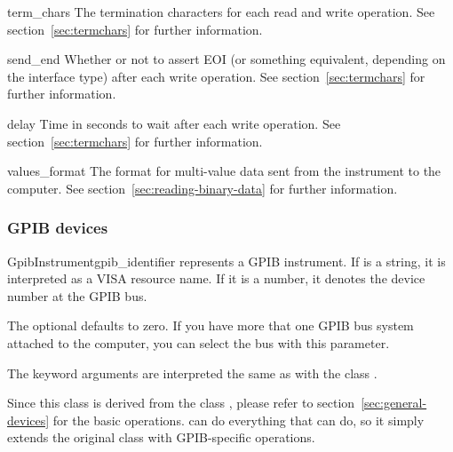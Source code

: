 \documentclass{howto}
\begin{document}
\begin{memberdesc}{term_chars}
  The termination characters for each read and write operation.  See
  section~\ref{sec:termchars} for further information.
\end{memberdesc}

\begin{memberdesc}{send_end}
  Whether or not to assert EOI (or something equivalent, depending on the
  interface type) after each write operation.  See section~\ref{sec:termchars}
  for further information.
\end{memberdesc}

\begin{memberdesc}{delay}
  Time in seconds to wait after each write operation.  See
  section~\ref{sec:termchars} for further information.
\end{memberdesc}

\begin{memberdesc}{values_format}
  The format for multi-value data sent from the instrument to the computer.
  See section~\ref{sec:reading-binary-data} for further information.
\end{memberdesc}


\subsubsection{GPIB devices}
\label{sec:gpib-devices}

\begin{classdesc}{GpibInstrument}{gpib_identifier}
  represents a GPIB instrument.  If  is a string, it is
  interpreted as a VISA resource name.  If it is a number, it denotes the
  device number at the GPIB bus.

  The optional  defaults to zero.  If you have more that one
  GPIB bus system attached to the computer, you can select the bus with this
  parameter.

  The keyword arguments are interpreted the same as with the class
  .
\end{classdesc}

\begin{notice}
  Since this class is derived from the class , please refer
  to section~\ref{sec:general-devices} for the basic operations.
   can do everything that  can do, so
  it simply extends the original class with GPIB-specific operations.
\end{notice}
\end{document}
